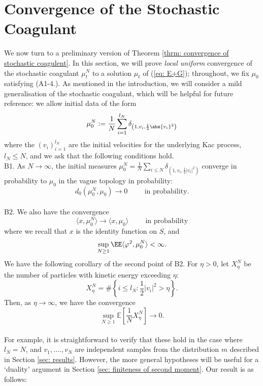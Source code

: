 \section{Convergence of the Stochastic Coagulant}
\label{sec: csc}

We now turn to a preliminary version of Theorem \ref{thrm: convergence of stochastic coagulent}.
In this section, we will prove \emph{local uniform} convergence of the stochastic coagulant $\mu^N_t$ to a solution $\mu_t$ of (\ref{eq: E+G}); throughout, we fix $\mu_0$ satisfying (A1-4.). As mentioned in the introduction, we will consider a mild generalisation of the stochastic coagulant, which will be helpful for future reference: we allow initial data of the form 
\begin{equation}
    \mu^N_0 := \frac1N \sum_{i=1}^{l_N} \delta_{\left(1,v_i, \frac12 \abs{v_i}^2\right)}
\end{equation}
where the $(v_i)_{i=1}^{l_N}$ are the initial velocities for the underlying Kac process, $l_N\le N$, and we ask that the following conditions hold.
\\B1. As $N\rightarrow \infty$, the initial measures $\mu^N_0=\frac1N\sum_{i\le N}\delta_{(1,v_i,\frac{1}{2}|v_i|^2)}$ converge in probability to $\mu_0$ in the vague topology in probability: \begin{equation}d_0(\mu^N_0, \mu_0)\rightarrow 0 \hspace{1cm}\text{in probability}. \end{equation} 
\\B2. We also have the convergence \begin{equation} \langle x, \mu^N_0\rangle \rightarrow \langle x, \mu_0\rangle \hspace{1cm} \text{in probability}\end{equation} where we recall that $x$ is the identity function on $S$, and \begin{equation} \sup_{N\ge 1} \EE\langle \varphi^2, \mu^N_0\rangle <\infty. \end{equation}
We have the following corollary of the second point of B2. For $\eta>0$, let $X^N_\eta$ be the number of particles with kinetic energy exceeding $\eta:$ \begin{equation}
    X^N_\eta= \#\left\{i\le l_N: \frac{1}{2}|v_i|^2>\eta\right\}.
\end{equation}Then, as $\eta\rightarrow \infty$, we have the convergence \begin{equation}\label{eq: b3} \sup_{N\ge 1} \mathbb{E}\left[\frac{1}{N}X^N_\eta\right]\rightarrow 0. \end{equation} \medskip \\ For example, it is straightforward to verify that these hold in the case where $l_N=N$, and $v_1,....,v_N$ are independent samples from the distribution $m$ described in Section \ref{sec: results}. However, the more general hypotheses will be useful for a `duality' argument in Section \ref{sec: finiteness of second moment}. Our result is as follows:

